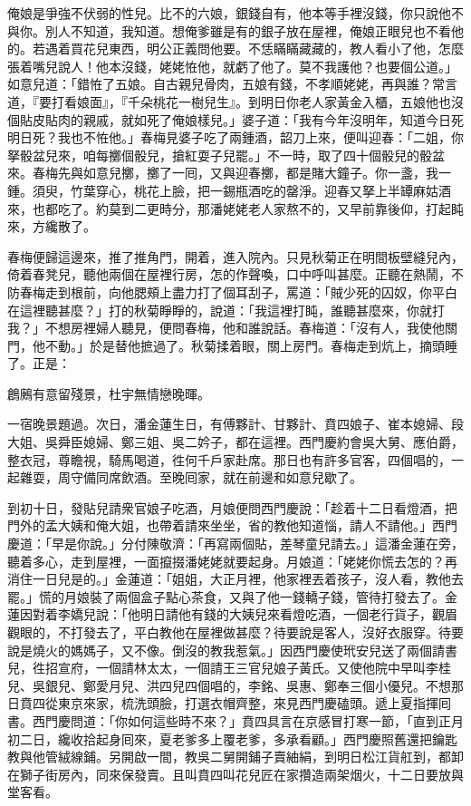 俺娘是爭強不伏弱的性兒。比不的六娘，銀錢自有，他本等手裡沒錢，你只說他不與你。別人不知道，我知道。{}想俺爹雖是有的銀子放在屋裡，俺娘正眼兒也不看他的。若遇着買花兒東西，明公正義問他要。不恁瞞瞞藏藏的，教人看小了他，怎麼張着嘴兒說人！他本沒錢，姥姥恠他，就虧了他了。莫不我護他？也要個公道。」{}如意兒道：「錯恠了五娘。自古親兒骨肉，五娘有錢，不孝順姥姥，再與誰？常言道，『要打看娘面』，『千朵桃花一樹兒生』。{}到明日你老人家黃金入櫃，五娘他也沒個貼皮貼肉的親戚，就如死了俺娘樣兒。」婆子道：「我有今年沒明年，知道今日死明日死？我也不恠他。」春梅見婆子吃了兩鍾酒，韶刀上來，便叫迎春：「二姐，你拏骰盆兒來，咱每擲個骰兒，搶紅耍子兒罷。」不一時，取了四十個骰兒的骰盆來。春梅先與如意兒擲，擲了一囘，又與迎春擲，都是賭大鐘子。你一盞，我一鍾。須臾，竹葉穿心，桃花上臉，把一錫瓶酒吃的罄淨。{}迎春又拏上半罈麻姑酒來，也都吃了。約莫到二更時分，那潘姥姥老人家熬不的，又早前靠後仰，打起盹來，方纔散了。

春梅便歸這邊來，推了推角門，開着，進入院內。只見秋菊正在明間板壁縫兒內，倚着春凳兒，聽他兩個在屋裡行房，怎的作聲喚，口中呼叫甚麼。正聽在熱鬧，不防春梅走到根前，向他腮頰上盡力打了個耳刮子，罵道：「賊少死的囚奴，你平白在這裡聽甚麼？」打的秋菊睜睜的，說道：「我這裡打盹，誰聽甚麼來，你就打我？」不想房裡婦人聽見，便問春梅，他和誰說話。春梅道：「沒有人，我使他關門，他不動。」於是替他摭過了。秋菊揉着眼，關上房門。春梅走到炕上，摘頭睡了。正是：

鶬鶊有意留殘景，杜宇無情戀晚暉。

一宿晚景題過。次日，潘金蓮生日，有傅夥計、甘夥計、賁四娘子、崔本媳婦、段大姐、吳舜臣媳婦、鄭三姐、吳二妗子，都在這裡。西門慶約會吳大舅、應伯爵，整衣冠，尊瞻視，騎馬喝道，徃何千戶家赴席。那日也有許多官客，四個唱的，一起雜耍，周守備同席飲酒。至晚囘家，就在前邊和如意兒歇了。

到初十日，發貼兒請衆官娘子吃酒，月娘便問西門慶說：「趁着十二日看燈酒，把門外的孟大姨和俺大姐，也帶着請來坐坐，省的教他知道惱，請人不請他。」西門慶道：「早是你說。」分付陳敬濟：「再寫兩個貼，差琴童兒請去。」這潘金蓮在旁，聽着多心，走到屋裡，一面攛掇潘姥姥就要起身。月娘道：「姥姥你慌去怎的？再消住一日兒是的。」金蓮道：「姐姐，大正月裡，他家裡丟着孩子，沒人看，教他去罷。」慌的月娘裝了兩個盒子點心茶食，又與了他一錢轎子錢，管待打發去了。金蓮因對着李嬌兒說：「他明日請他有錢的大姨兒來看燈吃酒，一個老行貨子，觀眉觀眼的，不打發去了，平白教他在屋裡做甚麼？待要說是客人，沒好衣服穿。待要說是燒火的媽媽子，又不像。倒沒的教我惹氣。」因西門慶使玳安兒送了兩個請書兒，徃招宣府，一個請林太太，一個請王三官兒娘子黃氏。又使他院中早叫李桂兒、吳銀兒、鄭愛月兒、洪四兒四個唱的，李銘、吳惠、鄭奉三個小優兒。不想那日賁四從東京來家，梳洗頭臉，打選衣帽齊整，來見西門慶磕頭。遞上夏指揮囘書。西門慶問道：「你如何這些時不來？」賁四具言在京感冒打寒一節，「直到正月初二日，纔收拾起身囘來，夏老爹多上覆老爹，多承看顧。」西門慶照舊還把鑰匙教與他管絨線鋪。另開啟一間，教吳二舅開鋪子賣紬絹，到明日松江貨舡到，都卸在獅子街房內，同來保發賣。且叫賁四叫花兒匠在家攢造兩架烟火，十二日要放與堂客看。

